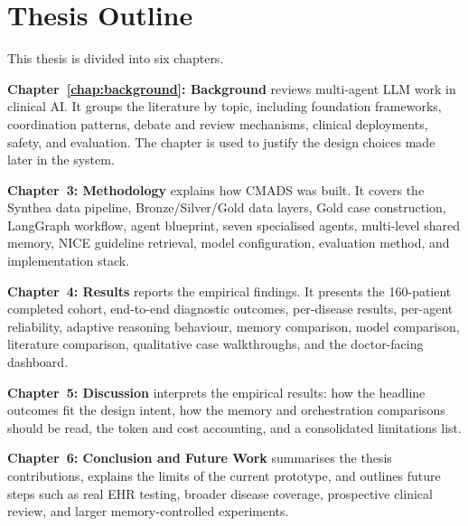\section{Thesis Outline}
\label{sec:outline}

This thesis is divided into six chapters.

\textbf{Chapter~\ref{chap:background}: Background} reviews multi-agent LLM work
in clinical AI. It groups the literature by topic, including foundation
frameworks, coordination patterns, debate and review mechanisms, clinical
deployments, safety, and evaluation. The chapter is used to justify the design
choices made later in the system.

\textbf{Chapter~3: Methodology} explains how CMADS was built. It covers the
Synthea data pipeline, Bronze/Silver/Gold data layers, Gold case construction,
LangGraph workflow, agent blueprint, seven specialised agents, multi-level
shared memory, NICE guideline retrieval, model configuration, evaluation method,
and implementation stack.

\textbf{Chapter~4: Results} reports the empirical findings. It presents the
160-patient completed cohort, end-to-end diagnostic outcomes, per-disease
results, per-agent reliability, adaptive reasoning behaviour, memory comparison,
model comparison, literature comparison, qualitative case walkthroughs, and the
doctor-facing dashboard.

\textbf{Chapter~5: Discussion} interprets the empirical results: how the
headline outcomes fit the design intent, how the memory and orchestration
comparisons should be read, the token and cost accounting, and a consolidated
limitations list.

\textbf{Chapter~6: Conclusion and Future Work} summarises the thesis
contributions, explains the limits of the current prototype, and outlines future
steps such as real EHR testing, broader disease coverage, prospective clinical
review, and larger memory-controlled experiments.
